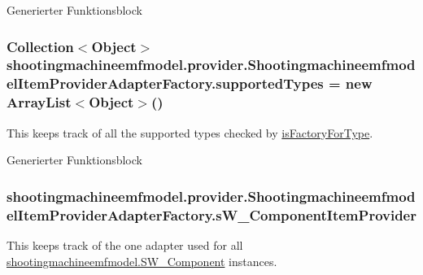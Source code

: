 Generierter Funktionsblock \hypertarget{classshootingmachineemfmodel_1_1provider_1_1_shootingmachineemfmodel_item_provider_adapter_factory_add0fefff4b45608069578e21ac84a4ec}{
\subsubsection[{supported\-Types}]{\setlength{\rightskip}{0pt plus 5cm}Collection$<$Object$>$ shootingmachineemfmodel.\-provider.\-Shootingmachineemfmodel\-Item\-Provider\-Adapter\-Factory.\-supported\-Types = new Array\-List$<$Object$>$()\hspace{0.3cm}{\ttfamily [protected]}}}\label{classshootingmachineemfmodel_1_1provider_1_1_shootingmachineemfmodel_item_provider_adapter_factory_add0fefff4b45608069578e21ac84a4ec}
This keeps track of all the supported types checked by \hyperlink{classshootingmachineemfmodel_1_1provider_1_1_shootingmachineemfmodel_item_provider_adapter_factory_ac02041f3111130056d7d0dd20648bb12}{is\-Factory\-For\-Type}.

Generierter Funktionsblock \hypertarget{classshootingmachineemfmodel_1_1provider_1_1_shootingmachineemfmodel_item_provider_adapter_factory_a4ca6904ab2b47792a1429a1732de0084}{
\subsubsection[{s\-W\-\_\-\-Component\-Item\-Provider}]{ shootingmachineemfmodel.\-provider.\-Shootingmachineemfmodel\-Item\-Provider\-Adapter\-Factory.\-s\-W\-\_\-\-Component\-Item\-Provider\hspace{0.3cm}{\ttfamily [protected]}}}\label{classshootingmachineemfmodel_1_1provider_1_1_shootingmachineemfmodel_item_provider_adapter_factory_a4ca6904ab2b47792a1429a1732de0084}
This keeps track of the one adapter used for all \hyperlink{interfaceshootingmachineemfmodel_1_1_s_w___component}{shootingmachineemfmodel.\-S\-W\-\_\-\-Component} instances.

